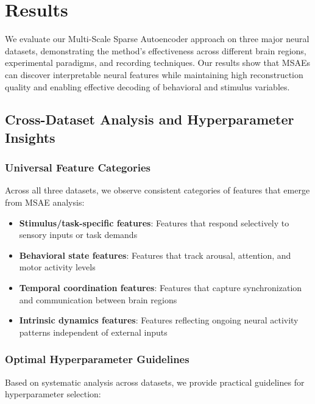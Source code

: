\section{Results}

We evaluate our Multi-Scale Sparse Autoencoder approach on three major neural datasets, demonstrating the method's effectiveness across different brain regions, experimental paradigms, and recording techniques. Our results show that MSAEs can discover interpretable neural features while maintaining high reconstruction quality and enabling effective decoding of behavioral and stimulus variables.





\subsection{Cross-Dataset Analysis and Hyperparameter Insights}

\subsubsection{Universal Feature Categories}

Across all three datasets, we observe consistent categories of features that emerge from MSAE analysis:

\begin{itemize}
\item \textbf{Stimulus/task-specific features}: Features that respond selectively to sensory inputs or task demands
\item \textbf{Behavioral state features}: Features that track arousal, attention, and motor activity levels
\item \textbf{Temporal coordination features}: Features that capture synchronization and communication between brain regions
\item \textbf{Intrinsic dynamics features}: Features reflecting ongoing neural activity patterns independent of external inputs
\end{itemize}

\subsubsection{Optimal Hyperparameter Guidelines}

Based on systematic analysis across datasets, we provide practical guidelines for hyperparameter selection:

